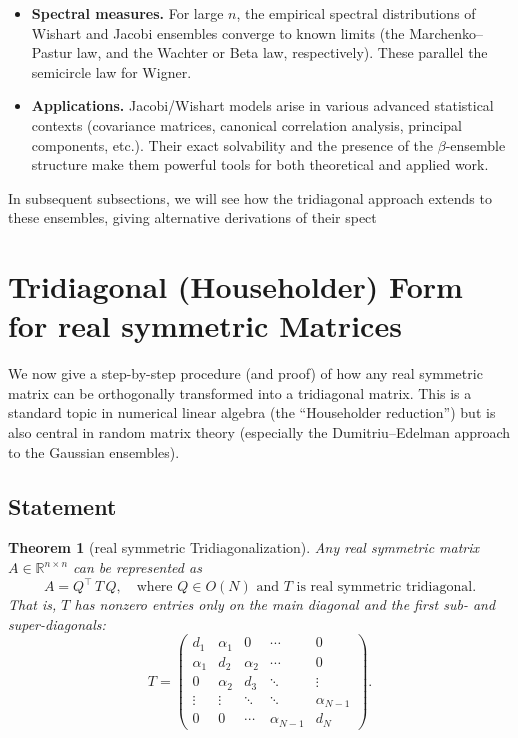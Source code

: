 \documentclass[letterpaper,11pt,oneside,reqno]{article}
\numberwithin{equation}{section}
\newtheorem{theorem}[proposition]{Theorem}
\theoremstyle{definition}
\begin{document}
\begin{itemize}
    \item \textbf{Spectral measures.} For large $n$, the empirical spectral distributions of Wishart and Jacobi ensembles converge to known limits (the Marchenko–Pastur law, and the Wachter or Beta law, respectively). These parallel the semicircle law for Wigner.
    
    \item \textbf{Applications.} Jacobi/Wishart models arise in various advanced statistical contexts (covariance matrices, canonical correlation analysis, principal components, etc.). Their exact solvability and the presence of the $\beta$-ensemble structure make them powerful tools for both theoretical and applied work.
\end{itemize}

In subsequent subsections, we will see how the tridiagonal approach extends to these ensembles, giving alternative derivations of their spect



\section{Tridiagonal (Householder) Form for real symmetric Matrices}
\label{sec:householder}

We now give a step-by-step procedure (and proof) of how any real symmetric matrix can be orthogonally transformed into a tridiagonal matrix. This is a standard topic in numerical linear algebra (the “Householder reduction”) but is also central in random matrix theory (especially the Dumitriu–Edelman approach to the Gaussian ensembles).

\subsection{Statement}

\begin{theorem}[real symmetric Tridiagonalization]
\label{thm:tridiagonal}
Any real symmetric matrix \(A\in\mathbb{R}^{n\times n}\) can be represented as
\[
  A = Q^\top\, T\, Q,
  \quad
  \text{where } Q\in O(N)
  \text{ and } T\text{ is real symmetric tridiagonal.}
\]
That is, \(T\) has nonzero entries only on the main diagonal and the first sub- and super-diagonals:
\[
  T = \begin{pmatrix}
         d_1 & \alpha_1 & 0 & \cdots & 0\\
         \alpha_1 & d_2 & \alpha_2 & \cdots & 0\\
         0 & \alpha_2 & d_3 & \ddots & \vdots\\
         \vdots & \vdots & \ddots & \ddots & \alpha_{N-1}\\
         0 & 0 & \cdots & \alpha_{N-1} & d_N
       \end{pmatrix}.
\]
\end{theorem}
\end{document}
